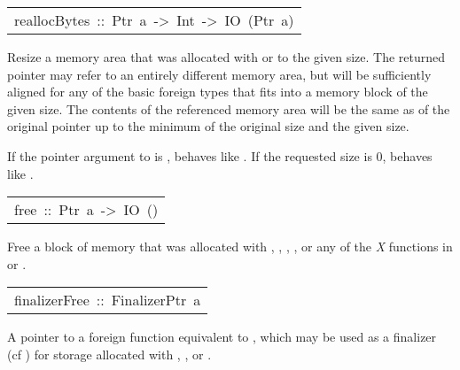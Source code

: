 \begin{haddockdesc}
\item[\begin{tabular}{@{}l}
reallocBytes\ ::\ Ptr\ a\ ->\ Int\ ->\ IO\ (Ptr\ a)
\end{tabular}]\haddockbegindoc
Resize a memory area that was allocated with  or 
 to the given size.  The returned pointer may refer to an entirely
 different memory area, but will be sufficiently aligned for any of the
 basic foreign types that fits into a memory block of the given size.
 The contents of the referenced memory area will be the same as of
 the original pointer up to the minimum of the original size and the
 given size.
\par
If the pointer argument to  is , 
 behaves like .  If the requested size is 0, 
 behaves like .
\par

\end{haddockdesc}
\begin{haddockdesc}
\item[\begin{tabular}{@{}l}
free\ ::\ Ptr\ a\ ->\ IO\ ()
\end{tabular}]\haddockbegindoc
Free a block of memory that was allocated with ,
 , , , 
 or any of the \emph{X} functions in  or
 .
\par

\end{haddockdesc}
\begin{haddockdesc}
\item[\begin{tabular}{@{}l}
finalizerFree\ ::\ FinalizerPtr\ a
\end{tabular}]\haddockbegindoc
A pointer to a foreign function equivalent to , which may be
 used as a finalizer (cf ) for storage
 allocated with , ,  or .
\par

\end{haddockdesc}